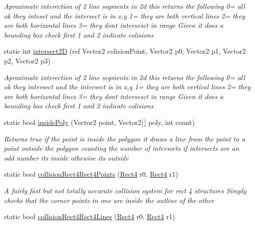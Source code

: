 \begin{DoxyCompactItemize}
\begin{DoxyCompactList}\small\item\em Aproximate interection of 2 line segments in 2d this returns the following 0= all ok they inteset and the intersect is in x,y 1= they are both vertical lines 2= they are both horizontal lines 3= they dont intersesct in range Given it does a bounding box check first 1 and 2 indicate colisions \end{DoxyCompactList}\item 
static int \mbox{\hyperlink{class_r_c___framework_1_1_util_a0ee1f0e0b21832dcbf6ec2865d0af2e3}{intersect2D}} (ref Vector2 colision\+Point, Vector2 p0, Vector2 p1, Vector2 p2, Vector2 p3)
\begin{DoxyCompactList}\small\item\em Aproximate interection of 2 line segments in 2d this returns the following 0= all ok they intersect and the intersect is in x,y 1= they are both vertical lines 2= they are both horizontal lines 3= they dont intersesct in range Given it does a bounding box check first 1 and 2 indicate colisions \end{DoxyCompactList}\item 
static bool \mbox{\hyperlink{class_r_c___framework_1_1_util_a286eafab09f04d0a65d82cc04315a606}{inside\+Poly}} (Vector2 point, Vector2\mbox{[}$\,$\mbox{]} poly, int count)
\begin{DoxyCompactList}\small\item\em Returns true if the point is inside the polygon it draws a line from the point to a point outside the polygon counting the number of intersects if intersects are an odd number its inside othewise its outside \end{DoxyCompactList}\item 
static bool \mbox{\hyperlink{class_r_c___framework_1_1_util_a5781bcc8d796c2c8c8f1d52a97aa66b3}{collision\+Rect4\+Rect4\+Points}} (\mbox{\hyperlink{class_r_c___framework_1_1_rect4}{Rect4}} r0, \mbox{\hyperlink{class_r_c___framework_1_1_rect4}{Rect4}} r1)
\begin{DoxyCompactList}\small\item\em A fairly fast but not totally accurate collision system for rect 4 structures Simply checks that the corner points in one are inside the outline of the other \end{DoxyCompactList}\item 
static bool \mbox{\hyperlink{class_r_c___framework_1_1_util_aa5997c26036537e821b8274bbc8348ff}{collision\+Rect4\+Rect4\+Lines}} (\mbox{\hyperlink{class_r_c___framework_1_1_rect4}{Rect4}} r0, \mbox{\hyperlink{class_r_c___framework_1_1_rect4}{Rect4}} r1)

\end{DoxyCompactItemize}
